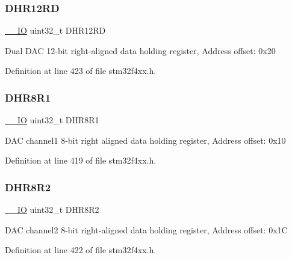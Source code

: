 \subsubsection{\texorpdfstring{D\+H\+R12\+RD}{DHR12RD}}
{\footnotesize\ttfamily \hyperlink{group___c_m_s_i_s__core__definitions_gaec43007d9998a0a0e01faede4133d6be}{\+\_\+\+\_\+\+IO} uint32\+\_\+t D\+H\+R12\+RD}

Dual D\+AC 12-\/bit right-\/aligned data holding register, Address offset\+: 0x20 

Definition at line 423 of file stm32f4xx.\+h.

\mbox{\label{struct_d_a_c___type_def_ad0a200e12acad17a5c7d2059159ea7e1}} 
\subsubsection{\texorpdfstring{D\+H\+R8\+R1}{DHR8R1}}
{\footnotesize\ttfamily \hyperlink{group___c_m_s_i_s__core__definitions_gaec43007d9998a0a0e01faede4133d6be}{\+\_\+\+\_\+\+IO} uint32\+\_\+t D\+H\+R8\+R1}

D\+AC channel1 8-\/bit right aligned data holding register, Address offset\+: 0x10 

Definition at line 419 of file stm32f4xx.\+h.

\mbox{\label{struct_d_a_c___type_def_a4c435f0e34ace4421241cd5c3ae87fc2}} 
\subsubsection{\texorpdfstring{D\+H\+R8\+R2}{DHR8R2}}
{\footnotesize\ttfamily \hyperlink{group___c_m_s_i_s__core__definitions_gaec43007d9998a0a0e01faede4133d6be}{\+\_\+\+\_\+\+IO} uint32\+\_\+t D\+H\+R8\+R2}

D\+AC channel2 8-\/bit right-\/aligned data holding register, Address offset\+: 0x1C 

Definition at line 422 of file stm32f4xx.\+h.

\mbox{\label{struct_d_a_c___type_def_a9590269cba8412f1be96b0ddb846ef44}} 
